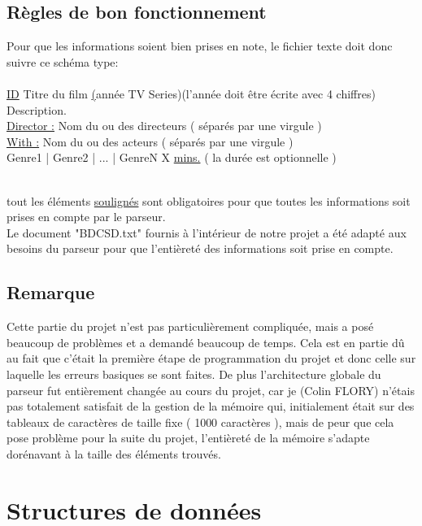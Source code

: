 \documentclass{article}
\begin{document}
\subsection{Règles de bon fonctionnement}
    Pour que les informations soient bien prises en note, le fichier texte doit donc suivre ce schéma type:\\ \\
    \underline{ID} Titre du film \underline(année TV Series)(l'année doit être écrite avec 4 chiffres)\\
    Description.\\
    \underline{Director :} Nom du ou des directeurs ( séparés par une virgule )\\
    \underline{With :} Nom du ou des acteurs ( séparés par une virgule )\\
    Genre1 | Genre2 | ... | GenreN X \underline{mins.} ( la durée est optionnelle )\\ \\
    \par tout les éléments \underline{soulignés} sont obligatoires pour que toutes les informations soit prises en compte par le parseur.\\
    Le document "BDCSD.txt" fournis à l'intérieur de notre projet a été adapté aux besoins du parseur pour que l'entièreté des informations soit prise en compte.
    
\subsection{Remarque}
    Cette partie du projet n'est pas particulièrement compliquée, mais a posé beaucoup de problèmes et a demandé beaucoup de temps. Cela est en partie dû au fait que c'était la première étape de programmation du projet et donc celle sur laquelle les erreurs basiques se sont faites. De plus l'architecture globale du parseur fut entièrement changée au cours du projet, car je (Colin FLORY) n'étais pas totalement satisfait de la gestion de la mémoire qui, initialement était sur des tableaux de caractères de taille fixe ( 1000 caractères ), mais de peur que cela pose problème pour la suite du projet, l'entièreté de la mémoire s'adapte dorénavant à la taille des éléments trouvés.  

\newpage









\section{Structures de données}
\end{document}
